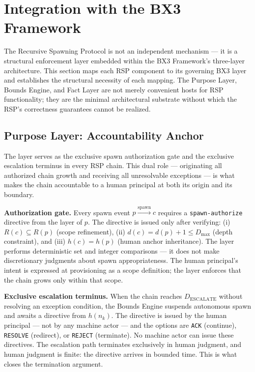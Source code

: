 \section{Integration with the BX3 Framework}
\label{sec:rs-integration}

The Recursive Spawning Protocol is not an independent mechanism — it is a structural enforcement layer embedded within the BX3 Framework's three-layer architecture. This section maps each RSP component to its governing BX3 layer and establishes the structural necessity of each mapping. The Purpose Layer, Bounds Engine, and Fact Layer are not merely convenient hosts for RSP functionality; they are the minimal architectural substrate without which the RSP's correctness guarantees cannot be realized.

\subsection{Purpose Layer: Accountability Anchor}
\label{sec:integration-purpose}

The \purpose{} layer serves as the exclusive spawn authorization gate and the exclusive escalation terminus in every RSP chain. This dual role — originating all authorized chain growth and receiving all unresolvable exceptions — is what makes the chain accountable to a human principal at both its origin and its boundary.

\medskip
\noindent\textbf{Authorization gate.}
Every spawn event $p \xrightarrow{\mathrm{spawn}} c$ requires a \texttt{spawn-authorize} directive from the \purpose{} layer of $p$. The directive is issued only after verifying: (i) $R(c) \subseteq R(p)$ (scope refinement), (ii) $d(c) = d(p) + 1 \leq D_{\max}$ (depth constraint), and (iii) $h(c) = h(p)$ (human anchor inheritance). The \purpose{} layer performs deterministic set and integer comparisons — it does not make discretionary judgments about spawn appropriateness. The human principal's intent is expressed at provisioning as a scope definition; the \purpose{} layer enforces that the chain grows only within that scope.

\medskip
\noindent\textbf{Exclusive escalation terminus.}
When the chain reaches $D_{\mathrm{ESCALATE}}$ without resolving an exception condition, the Bounds Engine suspends autonomous spawn and awaits a directive from $h(n_k)$. The directive is issued by the human principal — not by any machine actor — and the options are \texttt{ACK} (continue), \texttt{RESOLVE} (redirect), or \texttt{REJECT} (terminate). No machine actor can issue these directives. The escalation path terminates exclusively in human judgment, and human judgment is finite: the directive arrives in bounded time. This is what closes the termination argument.

